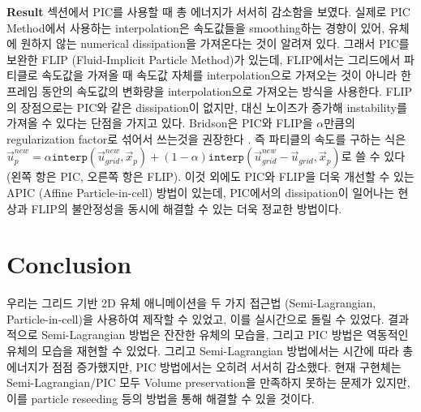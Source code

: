 \documentclass[12pt, A4]{article}
\begin{document}
\textbf{Result} 섹션에서 PIC를 사용할 때 총 에너지가 서서히 감소함을 보였다. 실제로 PIC Method에서 사용하는 interpolation은 속도값들을 smoothing하는 경향이 있어, 유체에 원하지 않는 numerical dissipation을 가져온다는 것이 알려져 있다. 그래서 PIC를 보완한 FLIP (Fluid-Implicit Particle Method)가 있는데, FLIP에서는 그리드에서 파티클로 속도값을 가져올 때 속도값 자체를 interpolation으로 가져오는 것이 아니라 한 프레임 동안의 속도값의 변화량을 interpolation으로 가져오는 방식을 사용한다. FLIP의 장점으로는 PIC와 같은 dissipation이 없지만, 대신 노이즈가 증가해 instability를 가져올 수 있다는 단점을 가지고 있다. Bridson은 PIC와 FLIP을 $\alpha$만큼의 regularization factor로 섞어서 쓰는것을 권장한다 \cite[p. 118]{fluid-sim-cg}. 즉 파티클의 속도를 구하는 식은 $\vec{u}_p^{new} = \alpha \texttt{interp}(\vec{u}_{grid}^{new}, \vec{x}_p) + (1 - \alpha) \texttt{interp}(\vec{u}_{grid}^{new} - \vec{u}_{grid}, \vec{x}_p)$로 쓸 수 있다 (왼쪽 항은 PIC, 오른쪽 항은 FLIP). 이것 외에도 PIC와 FLIP을 더욱 개선할 수 있는 APIC (Affine Particle-in-cell) 방법이 있는데, PIC에서의 dissipation이 일어나는 현상과 FLIP의 불안정성을 동시에 해결할 수 있는 더욱 정교한 방법이다. \cite{apic}

\section{Conclusion}

우리는 그리드 기반 2D 유체 애니메이션을 두 가지 접근법 (Semi-Lagrangian, Particle-in-cell)을 사용하여 제작할 수 있었고, 이를 실시간으로 돌릴 수 있었다. 결과적으로 Semi-Lagrangian 방법은 잔잔한 유체의 모습을, 그리고 PIC 방법은 역동적인 유체의 모습을 재현할 수 있었다. 그리고 Semi-Lagrangian 방법에서는 시간에 따라 총 에너지가 점점 증가했지만, PIC 방법에서는 오히려 서서히 감소했다. 현재 구현체는 Semi-Lagrangian/PIC 모두 Volume preservation을 만족하지 못하는 문제가 있지만, 이를 particle reseeding 등의 방법을 통해 해결할 수 있을 것이다.

\newpage 
\end{document}
